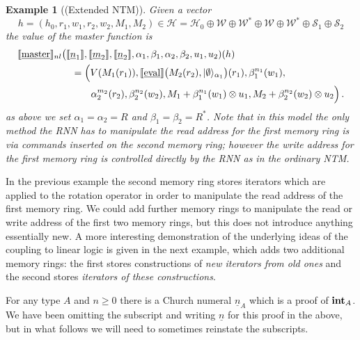 \documentclass[english,letter paper,12pt,leqno]{article}
\theoremstyle{example}
\newtheorem{example}[theorem]{Example}
\numberwithin{equation}{section}
\begin{document}
\begin{example}[(Extended NTM)]
Given a vector
\[
h = (h_0, r_1, w_1, r_2, w_2, M_1, M_2) \in \mathscr{H} = \mathscr{H}_0 \oplus \mathscr{W} \oplus \mathscr{W}^* \oplus \mathscr{W} \oplus \mathscr{W}^* \oplus \mathscr{S}_1 \oplus \mathscr{S}_2
\]
the value of the master function is
\begin{align*}
\llbracket \underline{\textup{master}} \rrbracket_{nl}&\big( \llbracket \underline{n}_1 \rrbracket, \llbracket \underline{m}_2 \rrbracket, \llbracket \underline{n}_2 \rrbracket, \alpha_1, \beta_1, \alpha_2, \beta_2, u_1, u_2 )(h)\\
&\quad = \Big(V(M_1(r_1)), \llbracket \underline{\mathrm{eval}} \rrbracket\big( M_2(r_2), \lvert\emptyset\rangle_{\alpha_1} \big)(r_1), \beta_1^{n_1}(w_1),\\
&\qquad \quad \alpha_2^{m_2}(r_2), \beta_2^{n_2}(w_2), M_1 + \beta_1^{n_1}(w_1) \otimes u_1, M_2 + \beta_2^{n_2}(w_2) \otimes u_2 \Big)\,.
\end{align*}
as above we set $\alpha_1 = \alpha_2 = R$ and $\beta_1 = \beta_2 = R^*$. Note that in this model the only method the RNN has to manipulate the read address for the first memory ring is via commands inserted on the second memory ring; however the write address for the first memory ring is controlled directly by the RNN as in the ordinary NTM.
\end{example}

In the previous example the second memory ring stores iterators which are applied to the rotation operator in order to manipulate the read address of the first memory ring. We could add further memory rings to manipulate the read or write address of the first two memory rings, but this does not introduce anything essentially new. A more interesting demonstration of the underlying ideas of the coupling to linear logic is given in the next example, which adds two additional memory rings: the first stores constructions of \emph{new iterators from old ones} and the second stores \emph{iterators of these constructions}.

For any type $A$ and $n \ge 0$ there is a Church numeral $\underline{n}_A$ which is a proof of $\textbf{int}_A$. We have been omitting the subscript and writing $\underline{n}$ for this proof in the above, but in what follows we will need to sometimes reinstate the subscripts.
\end{document}
